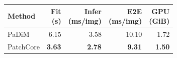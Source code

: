 \begin{tabular}{@{}lrrrr@{}}
\toprule
Method & \shortstack{Fit\\(s)} & \shortstack{Infer\\(ms/img)} & \shortstack{E2E\\(ms/img)} & \shortstack{GPU\\(GiB)} \\
\midrule
PaDiM & 6.15 & 3.58 & 10.10 & 1.72 \\
PatchCore & \textbf{3.63} & \textbf{2.78} & \textbf{9.31} & \textbf{1.50} \\
\bottomrule
\end{tabular}
